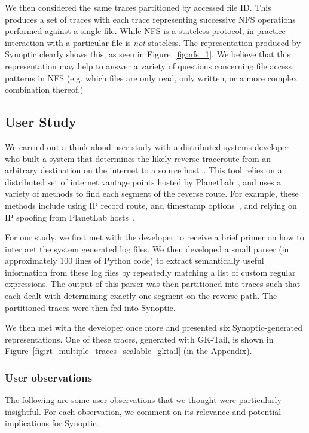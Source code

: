 We then considered the same traces partitioned by accessed file
ID. This produces a set of traces with each trace representing
successive NFS operations performed against a single file. While NFS
is a stateless protocol, in practice interaction with a particular
file is \emph{not} stateless. The representation produced by Synoptic
clearly shows this, as seen in Figure~\ref{fig:nfs_1}. We believe that
this representation may help to answer a variety of questions
concerning file access patterns in NFS (e.g. which files are only
read, only written, or a more complex combination thereof.)

\subsection{User Study}

We carried out a think-aloud user study with a distributed systems
developer who built a system that determines the likely reverse
traceroute from an arbitrary destination on the internet to a source
host~\cite{ReverseTraceroute}. This tool relies on a distributed set
of internet vantage points hosted by PlanetLab~\cite{PlanetLab}, and
uses a variety of methods to find each segment of the reverse
route. For example, these methods include using IP record route, and
timestamp options~\cite{IP_RR_RFC, IP_TS_RFC}, and relying on IP
spoofing from PlanetLab hosts~\cite{IP_Spoofing}.

For our study, we first met with the developer to receive a brief
primer on how to interpret the system generated log files. We then
developed a small parser (in approximately 100 lines of Python code)
to extract semantically useful information from these log files by
repeatedly matching a list of custom regular expressions. The output
of this parser was then partitioned into traces such that each dealt
with determining exactly one segment on the reverse path. The
partitioned traces were then fed into Synoptic.

We then met with the developer once more and presented six
Synoptic-generated representations. One of these traces, generated
with GK-Tail, is shown in
Figure~\ref{fig:rt_multiple_traces_scalable_gktail} (in the Appendix).

\subsubsection{User observations}

The following are some user observations that we thought were
particularly insightful. For each observation, we comment on its
relevance and potential implications for Synoptic.

